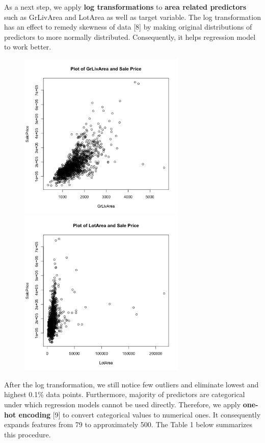 \documentclass[a4paper]{article}
\begin{document}
\begin{flushleft}
As a next step, we apply \textbf{log transformations} to \textbf{area related predictors} such as GrLivArea and LotArea as well as target variable. The log transformation has an effect to remedy skewness of data [8] by making original distributions of predictors to more normally distributed. Consequently, it helps regression model to work better. \newline

\begin{figure}[h]
\includegraphics[width=8cm]{../images/plot-GrLivArea.png}
\includegraphics[width=8cm]{../images/plot-LotArea.png}
\end{figure}

After the log transformation, we still notice few outliers and eliminate lowest and highest 0.1\% data points. Furthermore, majority of predictors are categorical under which regression models cannot be used directly. Therefore, we apply \textbf{one-hot encoding} [9] to convert categorical values to numerical ones. It consequently expands features from 79 to approximately 500. The Table 1 below summarizes this procedure. \newline


\end{flushleft}
\end{document}
